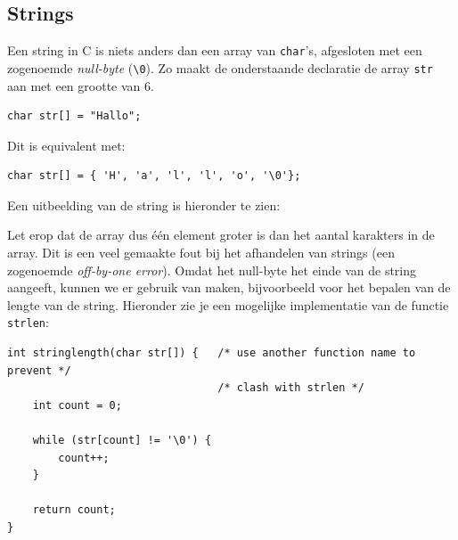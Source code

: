 \documentclass[a4paper,10pt,fleqn,twoside]{article}
\begin{document}
\subsection{Strings}
Een string in C is niets anders dan een array van \lstinline|char|'s, afgesloten met een zogenoemde \textsl{null-byte} (\lstinline|\0|). Zo maakt de onderstaande declaratie de array \lstinline|str| aan met een grootte van 6.

\begin{lstlisting}
char str[] = "Hallo";
\end{lstlisting}

Dit is equivalent met:

\begin{lstlisting}
char str[] = { 'H', 'a', 'l', 'l', 'o', '\0'};
\end{lstlisting}

Een uitbeelding van de string is hieronder te zien:

\begin{figure}[!ht]
\centering
{}
\end{figure}

Let erop dat de array dus \'e\'en element groter is dan het aantal karakters in de array. Dit is een veel gemaakte fout bij het afhandelen van strings (een zogenoemde \textsl{off-by-one error}). Omdat het null-byte het einde van de string aangeeft, kunnen we er gebruik van maken, bijvoorbeeld voor het bepalen van de lengte van de string. Hieronder zie je een mogelijke implementatie van de functie \lstinline|strlen|:

\begin{lstlisting}
int stringlength(char str[]) {   /* use another function name to prevent */
                                 /* clash with strlen */
	int count = 0;

    while (str[count] != '\0') {
        count++;
    }

	return count;
}
\end{lstlisting}

\end{document}
